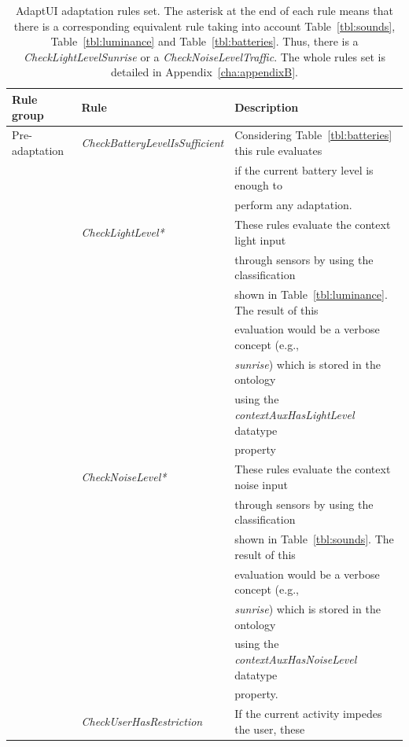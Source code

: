 \begin{table}[H]
  \caption{AdaptUI adaptation rules set. The asterisk at the end of each rule
  means that there is a corresponding equivalent rule taking into account
  Table~\ref{tbl:sounds}, Table~\ref{tbl:luminance} and Table~\ref{tbl:batteries}.
  Thus, there is a \textit{CheckLightLevelSunrise} or a \textit{CheckNoiseLevelTraffic}.
  The whole rules set is detailed in Appendix~\ref{cha:appendixB}.}
 \label{tbl:pre_adaptui_rules_set}
\footnotesize
\centering
 \begin{tabular}{l l l}
  \hline 
  \textbf{Rule group} 	& \textbf{Rule}					& \textbf{Description}						\\
  \hline
  Pre-adaptation 	& \textit{CheckBatteryLevelIsSufficient} 	& Considering Table~\ref{tbl:batteries} this rule evaluates	\\ 
			& 						& if the current battery level is enough to			\\
			& 						& perform any adaptation.					\\
			& \textit{CheckLightLevel*}			& These rules evaluate the context light input  		\\
			& 						& through sensors by using the classification 			\\
			& 						& shown in Table~\ref{tbl:luminance}. The result of  this	\\
			& 						& evaluation would be a verbose concept (e.g.,			\\
			&						& \textit{sunrise}) which is stored in the ontology		\\
			&						& using the \textit{contextAuxHasLightLevel} datatype 		\\
			&						& property							\\
			& \textit{CheckNoiseLevel*}			& These rules evaluate the context noise input 			\\
			& 						& through sensors by using the classification 			\\
			& 						& shown in Table~\ref{tbl:sounds}. The result of this		\\
			& 						& evaluation would be a verbose concept (e.g.,	 		\\
			&						& \textit{sunrise}) which is stored in the ontology  		\\
			&						& using the \textit{contextAuxHasNoiseLevel} datatype  		\\
			&						& property.							\\
			& \textit{CheckUserHasRestriction}		& If the current activity impedes the user, these 		\\

\end{tabular}
\end{table}
